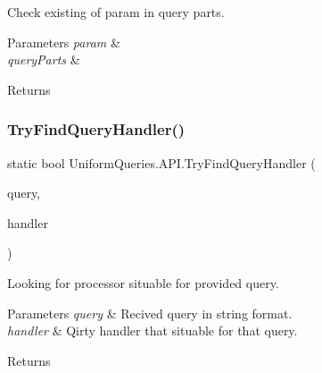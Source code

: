 Check existing of param in query parts. 


\begin{DoxyParams}{Parameters}
{\em param} & \\
\hline
{\em query\+Parts} & \\
\hline
\end{DoxyParams}
\begin{DoxyReturn}{Returns}

\end{DoxyReturn}
\mbox{\label{class_uniform_queries_1_1_a_p_i_a6b5e9796e2ed61c94fc49df8e6fec0d9}} 
\subsubsection{\texorpdfstring{Try\+Find\+Query\+Handler()}{TryFindQueryHandler()}\hspace{0.1cm}{\footnotesize\ttfamily [1/2]}}
{\footnotesize\ttfamily static bool Uniform\+Queries.\+A\+P\+I.\+Try\+Find\+Query\+Handler (\begin{DoxyParamCaption}\item[{string}]{query,  }\item[{out \mbox{\hyperlink{interface_uniform_queries_1_1_i_query_handler}{I\+Query\+Handler}}}]{handler }\end{DoxyParamCaption})\hspace{0.3cm}{\ttfamily [static]}}



Looking for processor situable for provided query. 


\begin{DoxyParams}{Parameters}
{\em query} & Recived query in string format.\\
\hline
{\em handler} & Qirty handler that situable for that query.\\
\hline
\end{DoxyParams}
\begin{DoxyReturn}{Returns}

\end{DoxyReturn}
\mbox{\label{class_uniform_queries_1_1_a_p_i_a0b929a433be6dc51a05718bd682317f9}} 

